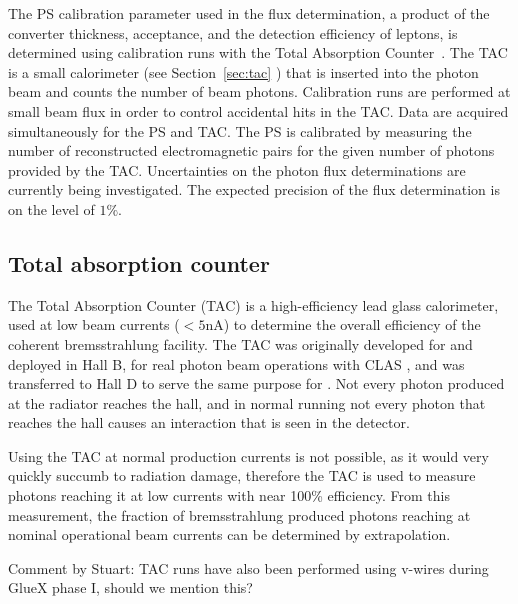 The PS calibration parameter used in the flux determination, a product of the 
converter thickness, acceptance, and the detection efficiency
of leptons, is determined using calibration runs with the Total 
Absorption Counter~\cite{somov_flux}. The TAC is a small calorimeter (see Section~\ref{sec:tac} ) 
that is inserted into the photon beam and counts the number of beam
photons. Calibration runs are performed at small beam flux in order
to control accidental hits in the TAC. Data are acquired simultaneously for
the PS and TAC. The PS is calibrated by measuring the number of reconstructed
electromagnetic pairs for the given number of photons provided by the TAC. 
Uncertainties on the photon flux determinations are currently being investigated.
The expected precision of the flux determination is on the level of $1\%$.



\subsection{Total absorption counter \label{sec:tac}}
The Total Absorption Counter (TAC) is a high-efficiency lead glass calorimeter, used at low beam currents ($<5$nA) to determine the overall efficiency of the coherent bremsstrahlung facility.
The TAC was originally developed for and deployed in Hall B, for real photon beam operations with CLAS \cite{clasnote1992014, clasnote1993011, clasnote1999002}, and was transferred to Hall D to serve the same purpose for \GX{}.
Not every photon produced at the radiator reaches the hall, and in normal \GX{} running not every photon that reaches the hall causes an interaction that is seen in the \GX{} detector.

Using the TAC at normal \GX{} production currents is not possible, as it would very quickly succumb to radiation damage, therefore the TAC is used to measure photons reaching it at low currents with near 100\% efficiency.
From this measurement, the fraction of bremsstrahlung produced photons reaching \GX{} at nominal operational beam currents can be determined by extrapolation.


{\color{red} Comment by Stuart: TAC runs have also been performed using v-wires during GlueX phase I, should we mention this?}


